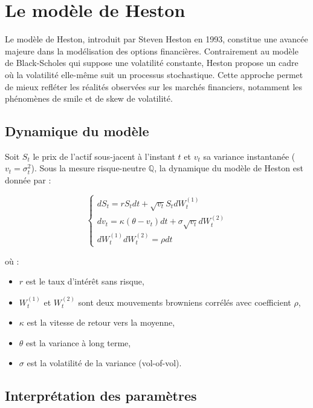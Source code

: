 
\section{Le modèle de Heston}

Le modèle de Heston, introduit par Steven Heston en 1993, constitue une avancée majeure dans la modélisation des options financières. Contrairement au modèle de Black-Scholes qui suppose une volatilité constante, Heston propose un cadre où la volatilité elle-même suit un processus stochastique. Cette approche permet de mieux refléter les réalités observées sur les marchés financiers, notamment les phénomènes de smile et de skew de volatilité.

\subsection{Dynamique du modèle}

Soit $S_t$ le prix de l’actif sous-jacent à l’instant $t$ et $v_t$ sa variance instantanée ($v_t = \sigma_t^2$). Sous la mesure risque-neutre $\mathbb{Q}$, la dynamique du modèle de Heston est donnée par :

\begin{equation}
	\begin{cases}
		dS_t = r S_t dt + \sqrt{v_t} S_t dW_t^{(1)} \\
		dv_t = \kappa(\theta - v_t)dt + \sigma \sqrt{v_t} dW_t^{(2)} \\
		dW_t^{(1)} dW_t^{(2)} = \rho dt
	\end{cases}
\end{equation}

où :
\begin{itemize}
	\item $r$ est le taux d'intérêt sans risque,
	\item $W_t^{(1)}$ et $W_t^{(2)}$ sont deux mouvements browniens corrélés avec coefficient $\rho$,
	\item $\kappa$ est la vitesse de retour vers la moyenne,
	\item $\theta$ est la variance à long terme,
	\item $\sigma$ est la volatilité de la variance (vol-of-vol).
\end{itemize}

\subsection{Interprétation des paramètres}

